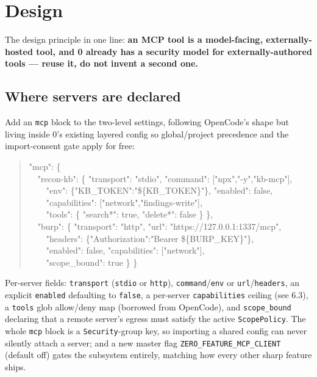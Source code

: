 \documentclass[11pt]{article}
\begin{document}
\section{Design}

The design principle in one line: \textbf{an MCP tool is a model-facing,
externally-hosted tool, and 0 already has a security model for
externally-authored tools --- reuse it, do not invent a second one.}

\subsection{Where servers are declared}

Add an \texttt{mcp} block to the two-level settings, following OpenCode's shape
but living inside 0's existing layered config so global/project precedence and
the import-consent gate apply for free:

\begin{quote}
\ttfamily
"mcp": \{\\
\ \ "recon-kb": \{ "transport": "stdio", "command": ["npx","-y","kb-mcp"],\\
\ \ \ \ "env": \{"KB\_TOKEN":"\$\{KB\_TOKEN\}"\}, "enabled": false,\\
\ \ \ \ "capabilities": ["network","findings-write"],\\
\ \ \ \ "tools": \{ "search*": true, "delete*": false \} \},\\
\ \ "burp": \{ "transport": "http", "url": "https://127.0.0.1:1337/mcp",\\
\ \ \ \ "headers": \{"Authorization":"Bearer \$\{BURP\_KEY\}"\},\\
\ \ \ \ "enabled": false, "capabilities": ["network"],\\
\ \ \ \ "scope\_bound": true \} \}
\end{quote}

Per-server fields: \texttt{transport} (\texttt{stdio} or \texttt{http}),
\texttt{command}/\texttt{env} or \texttt{url}/\texttt{headers}, an explicit
\texttt{enabled} defaulting to \texttt{false}, a per-server \texttt{capabilities}
ceiling (see 6.3), a \texttt{tools} glob allow/deny map (borrowed from OpenCode),
and \texttt{scope\_bound} declaring that a remote server's egress must satisfy
the active \texttt{ScopePolicy}. The whole \texttt{mcp} block is a
\texttt{Security}-group key, so importing a shared config can never silently
attach a server; and a new master flag \texttt{ZERO\_FEATURE\_MCP\_CLIENT}
(default off) gates the subsystem entirely, matching how every other sharp
feature ships.
\end{document}
